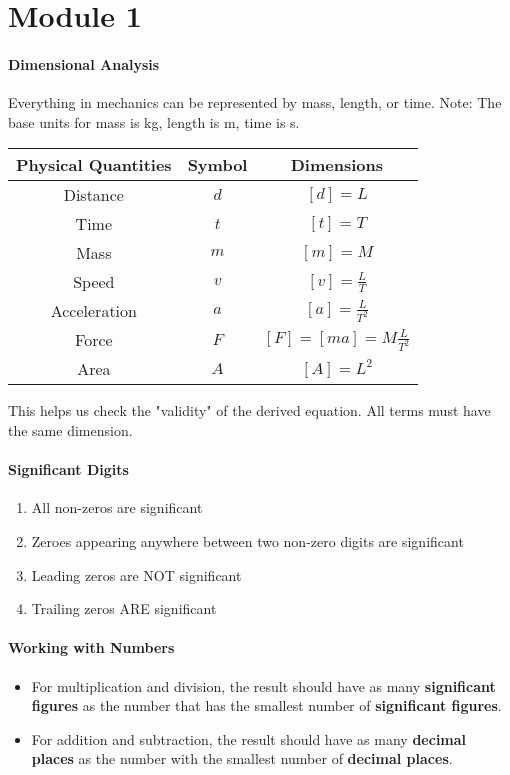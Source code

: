 \documentclass[10pt,letter]{article}
\begin{document}
\section*{Module 1}

\paragraph{Dimensional Analysis} Everything in mechanics can be represented by mass, length, or time. Note: The base units for mass is kg, length is m, time is s. 
\begin{center}
\begin{tabular}{c|c|c}
 Physical Quantities & Symbol & Dimensions \\
 \hline
 Distance & $d$ & $[d]=L$\\  
 Time & $t$ & $[t]=T$ \\ 
 Mass & $m$ & $[m]=M$\\ 
 Speed & $v$ & $[v]=\frac{L}{T}$\\ 
 Acceleration & $a$ & $[a]=\frac{L}{T^2}$\\ 
 Force & $F$ & $[F]=[ma]=M\frac{L}{T^2}$\\ 
 Area & $A$ & $[A]=L^2$
\end{tabular}
\end{center}
This helps us check the "validity" of the derived equation. All terms must have the same dimension. 

\paragraph{Significant Digits}
\begin{enumerate}
    \item All non-zeros are significant 
    \item Zeroes appearing anywhere between two non-zero digits are significant 
    \item Leading zeros are NOT significant 
    \item Trailing zeros ARE significant 
\end{enumerate}

\paragraph{Working with Numbers}
\begin{itemize}
    \item For multiplication and division, the result should have as many \textbf{significant figures} as the number that has the smallest number of \textbf{significant figures}.  
    \item For addition and subtraction, the result should have as many \textbf{decimal places} as the number with the smallest number of \textbf{decimal places}.
\end{itemize}
\end{document}
